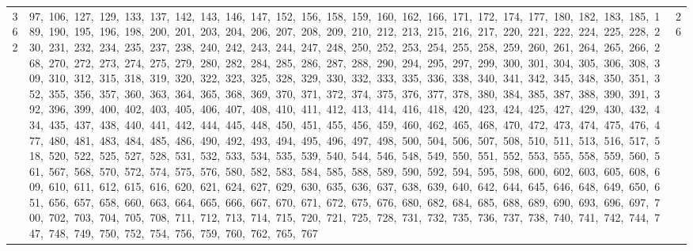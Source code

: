 \begin{longtable}{c|p{}|r}
362 & 97,\ 106,\ 127,\ 129,\ 133,\ 137,\ 142,\ 143,\ 146,\ 147,\ 152,\ 156,\ 158,\ 159,\ 160,\ 162,\ 166,\ 171,\ 172,\ 174,\ 177,\ 180,\ 182,\ 183,\ 185,\ 189,\ 190,\ 195,\ 196,\ 198,\ 200,\ 201,\ 203,\ 204,\ 206,\ 207,\ 208,\ 209,\ 210,\ 212,\ 213,\ 215,\ 216,\ 217,\ 220,\ 221,\ 222,\ 224,\ 225,\ 228,\ 230,\ 231,\ 232,\ 234,\ 235,\ 237,\ 238,\ 240,\ 242,\ 243,\ 244,\ 247,\ 248,\ 250,\ 252,\ 253,\ 254,\ 255,\ 258,\ 259,\ 260,\ 261,\ 264,\ 265,\ 266,\ 268,\ 270,\ 272,\ 273,\ 274,\ 275,\ 279,\ 280,\ 282,\ 284,\ 285,\ 286,\ 287,\ 288,\ 290,\ 294,\ 295,\ 297,\ 299,\ 300,\ 301,\ 304,\ 305,\ 306,\ 308,\ 309,\ 310,\ 312,\ 315,\ 318,\ 319,\ 320,\ 322,\ 323,\ 325,\ 328,\ 329,\ 330,\ 332,\ 333,\ 335,\ 336,\ 338,\ 340,\ 341,\ 342,\ 345,\ 348,\ 350,\ 351,\ 352,\ 355,\ 356,\ 357,\ 360,\ 363,\ 364,\ 365,\ 368,\ 369,\ 370,\ 371,\ 372,\ 374,\ 375,\ 376,\ 377,\ 378,\ 380,\ 384,\ 385,\ 387,\ 388,\ 390,\ 391,\ 392,\ 396,\ 399,\ 400,\ 402,\ 403,\ 405,\ 406,\ 407,\ 408,\ 410,\ 411,\ 412,\ 413,\ 414,\ 416,\ 418,\ 420,\ 423,\ 424,\ 425,\ 427,\ 429,\ 430,\ 432,\ 434,\ 435,\ 437,\ 438,\ 440,\ 441,\ 442,\ 444,\ 445,\ 448,\ 450,\ 451,\ 455,\ 456,\ 459,\ 460,\ 462,\ 465,\ 468,\ 470,\ 472,\ 473,\ 474,\ 475,\ 476,\ 477,\ 480,\ 481,\ 483,\ 484,\ 485,\ 486,\ 490,\ 492,\ 493,\ 494,\ 495,\ 496,\ 497,\ 498,\ 500,\ 504,\ 506,\ 507,\ 508,\ 510,\ 511,\ 513,\ 516,\ 517,\ 518,\ 520,\ 522,\ 525,\ 527,\ 528,\ 531,\ 532,\ 533,\ 534,\ 535,\ 539,\ 540,\ 544,\ 546,\ 548,\ 549,\ 550,\ 551,\ 552,\ 553,\ 555,\ 558,\ 559,\ 560,\ 561,\ 567,\ 568,\ 570,\ 572,\ 574,\ 575,\ 576,\ 580,\ 582,\ 583,\ 584,\ 585,\ 588,\ 589,\ 590,\ 592,\ 594,\ 595,\ 598,\ 600,\ 602,\ 603,\ 605,\ 608,\ 609,\ 610,\ 611,\ 612,\ 615,\ 616,\ 620,\ 621,\ 624,\ 627,\ 629,\ 630,\ 635,\ 636,\ 637,\ 638,\ 639,\ 640,\ 642,\ 644,\ 645,\ 646,\ 648,\ 649,\ 650,\ 651,\ 656,\ 657,\ 658,\ 660,\ 663,\ 664,\ 665,\ 666,\ 667,\ 670,\ 671,\ 672,\ 675,\ 676,\ 680,\ 682,\ 684,\ 685,\ 688,\ 689,\ 690,\ 693,\ 696,\ 697,\ 700,\ 702,\ 703,\ 704,\ 705,\ 708,\ 711,\ 712,\ 713,\ 714,\ 715,\ 720,\ 721,\ 725,\ 728,\ 731,\ 732,\ 735,\ 736,\ 737,\ 738,\ 740,\ 741,\ 742,\ 744,\ 747,\ 748,\ 749,\ 750,\ 752,\ 754,\ 756,\ 759,\ 760,\ 762,\ 765,\ 767 & 26 \\

\end{longtable}
